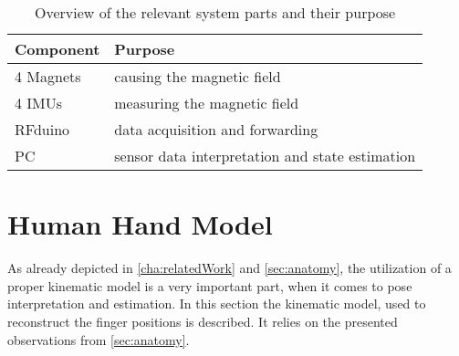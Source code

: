 \begin{table}[h]
\centering
\begin{tabular}{l|l}
\textbf{Component} & \textbf{Purpose} \\ \hline
4 Magnets & causing the magnetic field \\ \hline
4 \acp{IMU} & measuring the magnetic field \\ \hline
RFduino & data acquisition and forwarding \\ \hline
PC & sensor data interpretation and state estimation \\ %
\end{tabular}
\caption[List of system parts]{Overview of the relevant system parts and their purpose}
\label{tab:systemParts}
\end{table}

\FloatBarrier

\section{Human Hand Model} \label{sec:handModel}

As already depicted in \ref{cha:relatedWork} and \ref{sec:anatomy}, the utilization of a proper kinematic model is a very important part, when it comes to pose interpretation and estimation. In this section the kinematic model, used to reconstruct the finger positions is described. It relies on the presented observations from \ref{sec:anatomy}.

